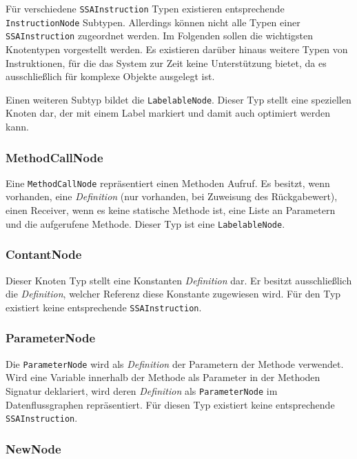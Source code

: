 Für verschiedene \texttt{SSAInstruction} Typen existieren entsprechende
\\\texttt{InstructionNode} Subtypen. Allerdings können nicht alle Typen 
einer \\\texttt{SSAInstruction} zugeordnet werden. Im Folgenden sollen die
wichtigsten Knotentypen vorgestellt werden. Es existieren darüber hinaus weitere
Typen von Instruktionen, für die das System zur Zeit keine Unterstützung bietet, 
da es ausschließlich für komplexe Objekte ausgelegt ist.

Einen weiteren Subtyp bildet die \texttt{LabelableNode}. Dieser Typ stellt eine
speziellen Knoten dar, der mit einem Label markiert und damit auch
optimiert werden kann. 

\subsubsection{MethodCallNode}

Eine \texttt{MethodCallNode} repräsentiert einen Methoden Aufruf. Es besitzt, wenn
vorhanden, eine \textit{Definition} (nur vorhanden, bei Zuweisung des Rückgabewert), einen Receiver, 
wenn es keine statische Methode ist, eine Liste an Parametern und die aufgerufene Methode. 
Dieser Typ ist eine \texttt{LabelableNode}.

\subsubsection{ContantNode}

Dieser Knoten Typ stellt eine Konstanten \textit{Definition} dar. Er besitzt ausschließlich 
die \textit{Definition}, welcher Referenz diese Konstante zugewiesen wird. Für den Typ
existiert keine entsprechende \texttt{SSAInstruction}.

\subsubsection{ParameterNode}

Die \texttt{ParameterNode} wird als \textit{Definition} der Parametern der Methode verwendet.
Wird eine Variable innerhalb der Methode als Parameter in der Methoden Signatur
deklariert, wird deren \textit{Definition} als \texttt{ParameterNode} im Datenflussgraphen
repräsentiert. Für diesen Typ existiert keine entsprechende \texttt{SSAInstruction}.

\subsubsection{NewNode}


